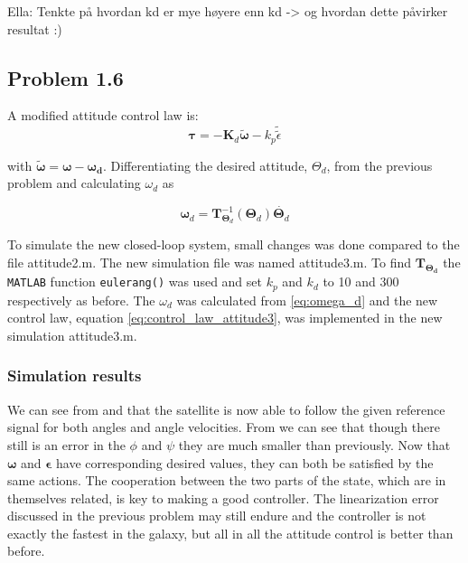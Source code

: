 Ella: Tenkte på hvordan kd er mye høyere enn kd -> og hvordan dette påvirker resultat :)

\subsection*{Problem 1.6}

A modified attitude control law is:
\begin{equation}
    \boldsymbol{\tau} = -\mathbf{K}_d\tilde{\boldsymbol{\omega}} -k_p\tilde{\tilde{\epsilon}}
    \label{eq:control_law_attitude3}
\end{equation}

with $\tilde{\boldsymbol{\omega}} = \boldsymbol{\omega} - \boldsymbol{\omega_d}$. Differentiating the desired attitude, $\Theta_d$, from the previous problem and calculating $\omega_d$ as

\begin{equation}
    \boldsymbol{\omega}_d = \mathbf{T}_{\boldsymbol{\Theta}_d}^{-1}(\boldsymbol{\Theta}_d)\dot{\boldsymbol{\Theta}_d}
    \label{eq:omega_d}
\end{equation}

To simulate the new closed-loop system, small changes was  done compared to the file {\color{blue} attitude2.m}. The new simulation file was named {\color{blue} attitude3.m}. To find $\mathbf{T}_{\boldsymbol{\Theta_d}}$ the \texttt{MATLAB} function \texttt{eulerang()} was used and set $k_p$ and $k_d$ to 10 and 300 respectively as before. The $\omega_d$ was calculated from \eqref{eq:omega_d} and the new control law, equation \eqref{eq:control_law_attitude3}, was implemented   in the new simulation {\color{blue} attitude3.m}.

\subsubsection*{Simulation results}

We can see from  and  that the satellite is now able to follow the given reference signal for both angles and angle velocities. From  we can see that though there still is an error in the $\phi$ and $\psi$ they are much smaller than previously. Now that $\boldsymbol{\omega}$ and $\boldsymbol{\epsilon}$ have corresponding desired values, they can both be satisfied by the same actions. The cooperation between the two parts of the state, which are in themselves related, is key to making a good controller. The linearization error discussed in the previous problem may still endure and the controller is not exactly the fastest in the galaxy, but all in all the attitude control is better than before.

